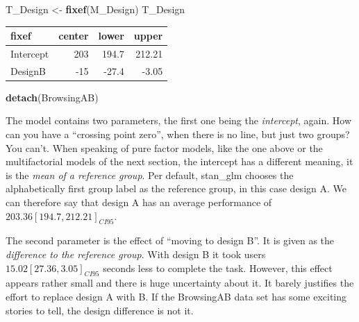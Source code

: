 \documentclass[]{svmono}
\newenvironment{Shaded}{\begin{snugshade}}{\end{snugshade}}
\newcommand{\KeywordTok}[1]{\textcolor[rgb]{0.13,0.29,0.53}{\textbf{#1}}}
\newcommand{\DataTypeTok}[1]{\textcolor[rgb]{0.13,0.29,0.53}{#1}}
\newcommand{\DecValTok}[1]{\textcolor[rgb]{0.00,0.00,0.81}{#1}}
\newcommand{\StringTok}[1]{\textcolor[rgb]{0.31,0.60,0.02}{#1}}
\newcommand{\OperatorTok}[1]{\textcolor[rgb]{0.81,0.36,0.00}{\textbf{#1}}}
\newcommand{\NormalTok}[1]{#1}
\begin{document}
\begin{Shaded}
\end{Shaded}

\begin{Shaded}
\begin{Highlighting}[]
\NormalTok{T_Design <-}\StringTok{ }\KeywordTok{fixef}\NormalTok{(M_Design)}
\NormalTok{T_Design}
\end{Highlighting}
\end{Shaded}

\begin{longtable}[]{@{}lrrr@{}}
\toprule
fixef & center & lower & upper\tabularnewline
\midrule
\endhead
Intercept & 203 & 194.7 & 212.21\tabularnewline
DesignB & -15 & -27.4 & -3.05\tabularnewline
\bottomrule
\end{longtable}

\begin{Shaded}
\begin{Highlighting}[]
\KeywordTok{detach}\NormalTok{(BrowsingAB)}
\end{Highlighting}
\end{Shaded}

The model contains two parameters, the first one being the
\emph{intercept}, again. How can you have a ``crossing point zero'',
when there is no line, but just two groups? You can't. When speaking of
pure factor models, like the one above or the multifactorial models of
the next section, the intercept has a different meaning, it is the
\emph{mean of a reference group}. Per default, stan\_glm chooses the
alphabetically first group label as the reference group, in this case
design A. We can therefore say that design A has an average performance
of \(203.36 [194.7, 212.21]_{CI95}\).

The second parameter is the effect of ``moving to design B''. It is
given as the \emph{difference to the reference group}. With design B it
took users \(15.02 [27.36, 3.05]_{CI95}\) seconds less to complete the
task. However, this effect appears rather small and there is huge
uncertainty about it. It barely justifies the effort to replace design A
with B. If the BrowsingAB data set has some exciting stories to tell,
the design difference is not it.
\end{document}

